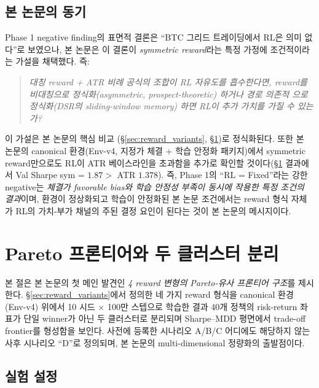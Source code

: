 \documentclass[11pt, a4paper]{article}
\begin{document}
\subsection{본 논문의 동기}
\label{sec:phase1_implication}

Phase 1 negative finding의 표면적 결론은 ``BTC 그리드 트레이딩에서 RL은 의미
없다''로 보였으나, 본 논문은 이 결론이 \emph{symmetric reward}라는 특정 가정에
조건적이라는 가설을 채택했다. 즉:

\begin{quote}
\emph{대칭 reward + ATR 비례 공식의 조합이 RL 자유도를 흡수한다면, reward를
\emph{비대칭}으로 정식화(asymmetric, prospect-theoretic) 하거나 \emph{경로 의존적}
으로 정식화(DSR의 sliding-window memory) 하면 RL이 추가 가치를 가질 수 있는가?}
\end{quote}

이 가설은 본 논문의 핵심 비교 (\S\ref{sec:reward_variants}, \S\ref{sec:pareto})로
정식화된다. 또한 본 논문의 canonical 환경(Env-v4, 지정가 체결 + 학습 안정화
패키지)에서 symmetric reward만으로도 RL이 ATR 베이스라인을 초과함을 추가로
확인할 것이다(\S\ref{sec:pareto} 결과에서 Val Sharpe sym = $1.87 > $ ATR
$1.378$). 즉, Phase 1의 ``RL = Fixed''라는 강한 negative는 \emph{체결가 favorable
bias와 학습 안정성 부족이 동시에 작용한 특정 조건의 결과}이며, 환경이 정상화되고
학습이 안정화된 본 논문 조건에서는 reward 형식 자체가 RL의 가치-부가 채널의
주된 결정 요인이 된다는 것이 본 논문의 메시지이다.

\section{Pareto 프론티어와 두 클러스터 분리}
\label{sec:pareto}

본 절은 본 논문의 첫 메인 발견인 \emph{4 reward 변형의 Pareto-유사 프론티어
구조}를 제시한다. \S\ref{sec:reward_variants}에서 정의한 네 가지 reward 형식을
canonical 환경(Env-v4) 위에서 10 시드 $\times$ 100만 스텝으로 학습한 결과
40개 정책의 risk-return 좌표가 단일 winner가 아닌 두 클러스터로 분리되며 Sharpe--MDD
평면에서 trade-off frontier를 형성함을 보인다. 사전에 등록한 시나리오
A/B/C 어디에도 해당하지 않는 사후 시나리오 ``D''로 정의되며, 본 논문의
multi-dimensional 정량화의 출발점이다.

\subsection{실험 설정}
\label{sec:pareto_setup}
\end{document}
